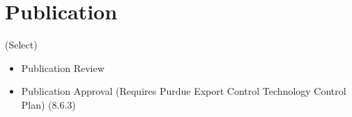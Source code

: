 \section{Publication}
{\color{red}(Select)}
\begin{itemize}
    \item  Publication Review
    \item Publication Approval (Requires Purdue Export Control Technology Control Plan) (8.6.3)
\end{itemize}
